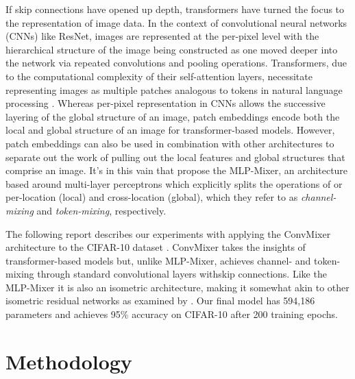 \documentclass[letterpaper]{article} %
\begin{document}
If skip connections have opened up depth, transformers have turned the focus to the representation of image data. In the context of convolutional neural networks (CNNs) like ResNet, images are represented at the per-pixel level with the hierarchical structure of the image being constructed as one moved deeper into the network via repeated convolutions and pooling operations. Transformers, due to the computational complexity of their self-attention layers, necessitate representing images as multiple patches analogous to tokens in natural language processing \citep{Dosovitskiy2020}. Whereas per-pixel representation in CNNs allows the successive layering of the global structure of an image, patch embeddings encode both the local and global structure of an image for transformer-based models. However, patch embeddings can also be used in combination with other architectures to separate out the work of pulling out the local features and global structures that comprise an image. It's in this vain that \citet{Tolstikhin2021} propose the MLP-Mixer, an architecture based around multi-layer perceptrons which explicitly splits the operations of or per-location (local) and cross-location (global), which they refer to as \textit{channel-mixing} and \textit{token-mixing}, respectively. 

The following report describes our experiments with applying the ConvMixer architecture to the CIFAR-10 dataset \citep{Krizhevsky2009LearningML}. ConvMixer takes the insights of transformer-based models but, unlike MLP-Mixer, achieves channel- and token-mixing through standard convolutional layers withskip connections. Like the MLP-Mixer it is also an isometric architecture, making it somewhat akin to other isometric residual networks as examined by \citet{Sandler2019}. Our final model has 594,186 parameters and achieves 95\% accuracy on CIFAR-10 after 200 training epochs.

\section{Methodology}
\end{document}
